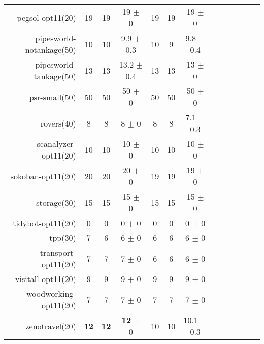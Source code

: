 \begin{center}
\begin{tabular}{|r|*{4}{ccc|}}
pegsol-opt11(20) & 19 & 19 & 19 $\pm$ 0 & 19 & 19 & 19 $\pm$ 0\\
pipesworld-notankage(50) & 10 & 10 & 9.9 $\pm$ 0.3 & 10 & 9 & 9.8 $\pm$ 0.4\\
pipesworld-tankage(50) & 13 & 13 & 13.2 $\pm$ 0.4 & 13 & 13 & 13 $\pm$ 0\\
psr-small(50) & 50 & 50 & 50 $\pm$ 0 & 50 & 50 & 50 $\pm$ 0\\
rovers(40) & 8 & 8 & 8 $\pm$ 0 & 8 & 8 & 7.1 $\pm$ 0.3\\
scanalyzer-opt11(20) & 10 & 10 & 10 $\pm$ 0 & 10 & 10 & 10 $\pm$ 0\\
sokoban-opt11(20) & 20 & 20 & 20 $\pm$ 0 & 19 & 19 & 19 $\pm$ 0\\
storage(30) & 15 & 15 & 15 $\pm$ 0 & 15 & 15 & 15 $\pm$ 0\\
tidybot-opt11(20) & 0 & 0 & 0 $\pm$ 0 & 0 & 0 & 0 $\pm$ 0\\
tpp(30) & 7 & 6 & 6 $\pm$ 0 & 6 & 6 & 6 $\pm$ 0\\
transport-opt11(20) & 7 & 7 & 7 $\pm$ 0 & 6 & 6 & 6 $\pm$ 0\\
visitall-opt11(20) & 9 & 9 & 9 $\pm$ 0 & 9 & 9 & 9 $\pm$ 0\\
woodworking-opt11(20) & 7 & 7 & 7 $\pm$ 0 & 7 & 7 & 7 $\pm$ 0\\
zenotravel(20) & \textbf{12} & \textbf{12} & \textbf{12} $\pm$ 0 & 10 & 10 & 10.1 $\pm$ 0.3\\
\end{tabular}
\end{center}
